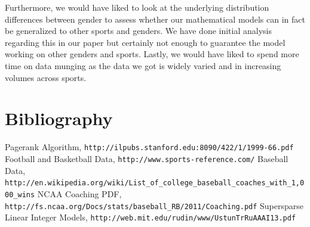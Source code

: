\documentclass[11pt,notitlepage]{article}
\begin{document}
\vspace{2 mm}

\noindent Furthermore, we would have liked to look at the underlying distribution differences between gender to assess whether our mathematical models can in fact be generalized to other sports and genders. We have done initial analysis regarding this in our paper but certainly not enough to guarantee the model working on other genders and sports. Lastly, we would have liked to spend more time on data munging as the data we got is widely varied and in increasing volumes across sports.  

\pagebreak

\section{Bibliography}
\begin{thebibliography}{9}

 Pagerank Algorithm,
\verb|http://ilpubs.stanford.edu:8090/422/1/1999-66.pdf|
 Football and Basketball Data,
\verb|http://www.sports-reference.com/|
 Baseball Data,
\verb|http://en.wikipedia.org/wiki/List_of_college_baseball_coaches_with_1,000_wins|
 NCAA Coaching PDF,
\verb|http://fs.ncaa.org/Docs/stats/baseball_RB/2011/Coaching.pdf|
 Supersparse Linear Integer Models,
\verb|http://web.mit.edu/rudin/www/UstunTrRuAAAI13.pdf|

\end{thebibliography}
\end{document}
